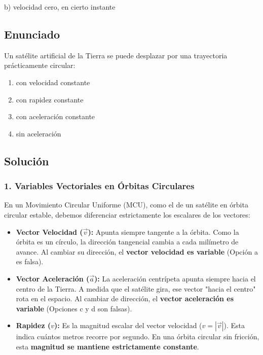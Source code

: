 \documentclass[12pt, a4paper]{article}
\begin{document}
\begin{tcolorbox}[colback=green!5!white, colframe=green!50!black, title=Respuesta Final]
\centering \Large b) velocidad cero, en cierto instante
\end{tcolorbox}

\newpage

\subsection*{Enunciado}
Un satélite artificial de la Tierra se puede desplazar por una trayectoria prácticamente circular:
\begin{enumerate}[label=\alph*)]
    \item con velocidad constante
    \item con rapidez constante
    \item con aceleración constante
    \item sin aceleración
\end{enumerate}

\subsection*{Solución}

\subsubsection*{1. Variables Vectoriales en Órbitas Circulares}
En un Movimiento Circular Uniforme (MCU), como el de un satélite en órbita circular estable, debemos diferenciar estrictamente los escalares de los vectores:
\begin{itemize}
    \item \textbf{Vector Velocidad ($\vec{v}$):} Apunta siempre tangente a la órbita. Como la órbita es un círculo, la dirección tangencial cambia a cada milímetro de avance. Al cambiar su dirección, el \textbf{vector velocidad es variable} (Opción a es falsa).
    \item \textbf{Vector Aceleración ($\vec{a}$):} La aceleración centrípeta apunta siempre hacia el centro de la Tierra. A medida que el satélite gira, ese vector "hacia el centro" rota en el espacio. Al cambiar de dirección, el \textbf{vector aceleración es variable} (Opciones c y d son falsas).
    \item \textbf{Rapidez ($v$):} Es la magnitud escalar del vector velocidad ($v = |\vec{v}|$). Esta indica cuántos metros recorre por segundo. En una órbita circular sin fricción, esta \textbf{magnitud se mantiene estrictamente constante}.
\end{itemize}
\end{document}
